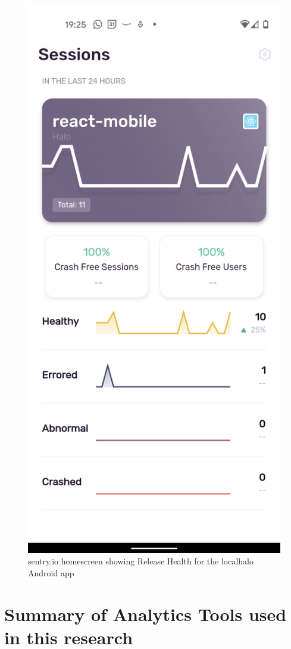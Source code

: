 \begin{figure}
    \centering
    \includegraphics{images/sentry.io/Screenshot_20210914-192538.png}
    \caption{sentry.io homescreen showing Release Health for the localhalo Android app}
    \label{fig:sentry-io-homescreen-release-health-for-localhalo-android}
\end{figure}


\section{Summary of Analytics Tools used in this research}

